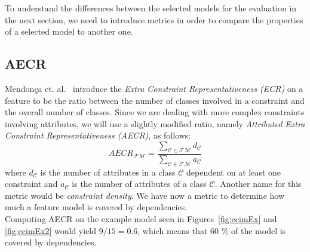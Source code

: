To understand the differences between the selected models for the evaluation in the next section, we need to introduce metrics in order to compare the properties of a selected model to another one. 


\subsection*{AECR}
Mendon\c{c}a et. al.~\cite[p.~2]{ecr} introduce the \emph{Extra Constraint Representativeness (ECR)} on a feature to be the ratio between the number of classes involved in a constraint and the overall number of classes. Since we are dealing with more complex constraints involving attributes, we will use a slightly modified ratio, namely \emph{Attributed Extra Constraint Representativeness (AECR)}, as follows:
 \[
  AECR_{\mathcal{FM}} = \frac{\sum\limits_{\mathcal{C} \in \mathcal{FM}} d_{\mathcal{C}}} {\sum\limits_{\mathcal{C} \in \mathcal{FM}} a_{\mathcal{C}}}
 \]
where $d_{\mathcal{C}}$ is the number of attributes in a class $\mathcal{C}$ dependent on at least one constraint and $a_{\mathcal{C}}$ is the number of attributes of a class $\mathcal{C}$. Another name for this metric would be  \emph{constraint density}. We have now a metric to determine how much a feature model is covered by dependencies.\\

Computing AECR on the example model seen in Figures~\ref{fig:ecimEx} and \ref{fig:ecimEx2} would yield $9 / 15 = 0.6$, which means that 60 \% of the model is covered by dependencies.




